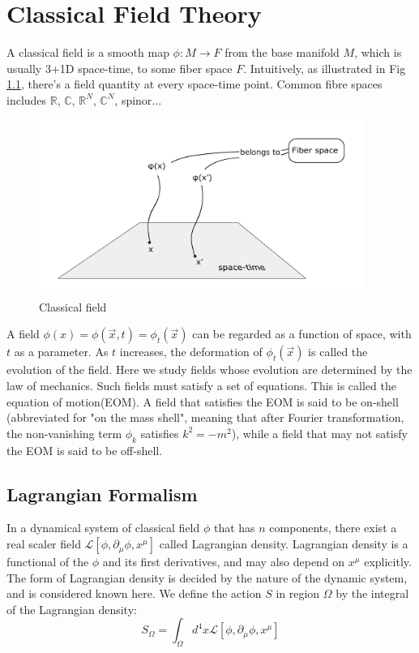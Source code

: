\documentclass[12pt]{book}
\begin{document}
\chapter{Classical Field Theory}

	A  classical field is a smooth map $\phi:M\rightarrow F$ from the base manifold $M$, which is usually 3+1D space-time, to some fiber space $F$. Intuitively, as illustrated in Fig \ref{fig:field}, there's a field quantity at every space-time point. Common fibre spaces includes $\mathbb{R}$, $\mathbb{C}$, $\mathbb{R}^N$, $\mathbb{C}^N$, spinor... 
	
	\begin{figure}[htb]
		\centering  
		\includegraphics[width=300pt]{resources/chap_classical/1_0_field.pdf}
		\caption{Classical field}
		\label{fig:field} 
	\end{figure}
	
	A field $\phi(x)=\phi(\vec x,t)=\phi_t(\vec x)$ can be regarded as a function of space, with $t$ as a parameter. As $t$ increases, the deformation of $\phi_t(\vec x)$ is called the evolution of the field. Here we study fields whose evolution are determined by the law of mechanics. Such fields must satisfy a set of equations. This is called the  equation of motion(EOM). A field that satisfies the EOM is said to be  on-shell (abbreviated for "on the mass shell", meaning that after Fourier transformation, the non-vanishing term $\phi_k$  satisfies $k^2=-m^2$), while a field that may not satisfy the EOM is said to be  off-shell. 
	
	\section{Lagrangian Formalism}
	In a dynamical system of classical field $\phi$ that has $n$ components, there exist a real scaler field $\mathcal{L}[\phi,\partial_\mu\phi,x^\mu]$ called  Lagrangian density. Lagrangian density is a functional of the $\phi$ and its first derivatives, and may also depend on $x^\mu$ explicitly. The form of Lagrangian density is decided by the nature of the dynamic system, and is considered known here. We define the  action $S$ in region $\Omega$ by the integral of the Lagrangian density:
	\begin{equation}
		S_\Omega=\int_{\Omega}d^4x\mathcal{L}[\phi,\partial_\mu\phi,x^\mu] \label{eqn:action}
	\end{equation}
	
\end{document}
